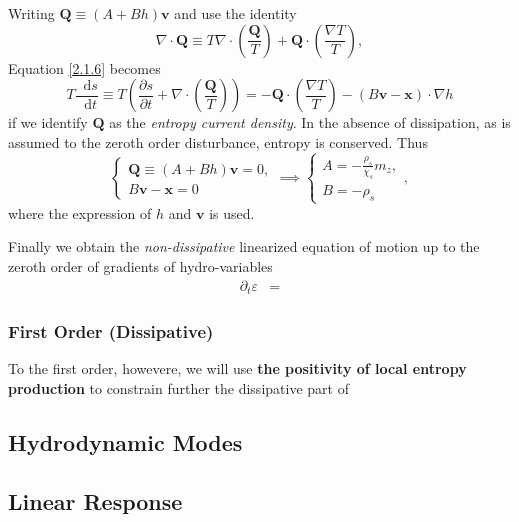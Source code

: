 \documentclass[10pt,nofootinbib]{revtex4}
\newcommand*\dd{\mathop{}\!\mathrm{d}}
\begin{document}
			Writing $\bm{Q}\equiv (A+Bh)\bm{v}$ and use the identity
			\begin{equation*}
				\nabla\cdot\bm{Q}\equiv T\nabla\cdot \left(\dfrac{\bm{Q}}{T}\right)+\bm{Q}\cdot \left(\dfrac{\nabla T}{T}\right),  
			\end{equation*}
			Equation \eqref{2.1.6} becomes
			\begin{equation}\label{2.1.7}
				T\dfrac{\dd s}{\dd t}\equiv T \left(\dfrac{\partial s}{\partial t}+\nabla\cdot \left(\dfrac{\bm{Q}}{T}\right) \right)=-\bm{Q}\cdot \left(\dfrac{\nabla T}{T}\right)-(B\bm{v}-\bm{x})\cdot\nabla h
			\end{equation}
			if we identify $\bm{Q}$ as the \emph{entropy current density}. In the absence of dissipation, as is assumed to the zeroth order disturbance, entropy is conserved. Thus
			\begin{equation}\label{2.1.8}
				\begin{cases}
					\bm{Q}\equiv (A+Bh)\bm{v}=0,\\
					B\bm{v}-\bm{x}=0
				\end{cases}\implies
				\begin{cases}
					A=-\frac{\rho_s}{\chi_s}m_z,\\
					B=-\rho_s
				\end{cases},
			\end{equation}
			where the expression of $h$ and $\bm{v}$ is used.\par
			Finally we obtain the \emph{non-dissipative} linearized equation of motion up to the zeroth order of gradients of hydro-variables
			\begin{align}
				\partial_t\varepsilon&=
			\end{align}

		\subsubsection{First Order (Dissipative)}
			To the first order, howevere, we will use {\bf the positivity of local entropy production} to constrain further the dissipative part of
	\subsection{Hydrodynamic Modes}
	\subsection{Linear Response}
\end{document}
